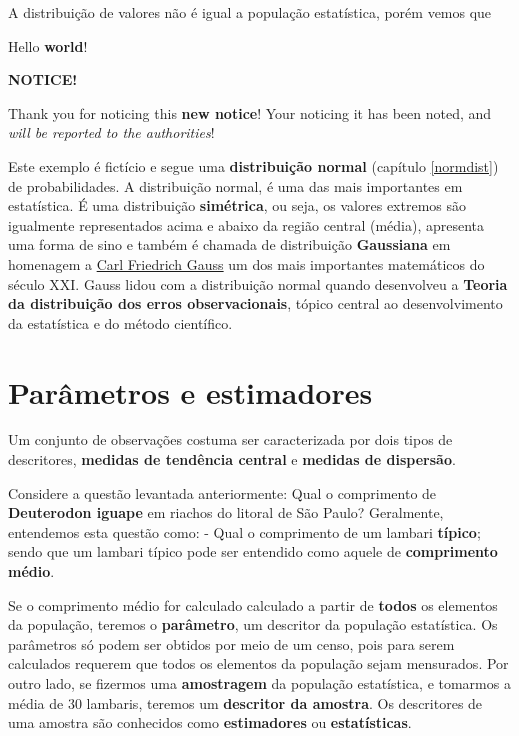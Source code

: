 \documentclass[
]{book}
\begin{document}
A distribuição de valores não é igual a população estatística, porém vemos que

\leavevmode{}%
Hello \textbf{world}!

\begin{blackbox}

\begin{center}
\textbf{NOTICE!}

\end{center}

Thank you for noticing this \textbf{new notice}! Your noticing it has
been noted, and \emph{will be reported to the authorities}!

\end{blackbox}

Este exemplo é fictício e segue uma \textbf{distribuição normal} (capítulo \ref{normdist}) de probabilidades. A distribuição normal, é uma das mais importantes em estatística. É uma distribuição \textbf{simétrica}, ou seja, os valores extremos são igualmente representados acima e abaixo da região central (média), apresenta uma forma de sino e também é chamada de distribuição \textbf{Gaussiana} em homenagem a \href{https://en.wikipedia.org/wiki/Carl_Friedrich_Gauss}{Carl Friedrich Gauss} um dos mais importantes matemáticos do século XXI. Gauss lidou com a distribuição normal quando desenvolveu a \textbf{Teoria da distribuição dos erros observacionais}, tópico central ao desenvolvimento da estatística e do método científico.

\hypertarget{paruxe2metros-e-estimadores}{%
\section{Parâmetros e estimadores}\label{paruxe2metros-e-estimadores}}

Um conjunto de observações costuma ser caracterizada por dois tipos de descritores, \textbf{medidas de tendência central} e \textbf{medidas de dispersão}.

Considere a questão levantada anteriormente: Qual o comprimento de \textbf{Deuterodon iguape} em riachos do litoral de São Paulo? Geralmente, entendemos esta questão como: - Qual o comprimento de um lambari \textbf{típico}; sendo que um lambari típico pode ser entendido como aquele de \textbf{comprimento médio}.

Se o comprimento médio for calculado calculado a partir de \textbf{todos} os elementos da população, teremos o \textbf{parâmetro}, um descritor da população estatística. Os parâmetros só podem ser obtidos por meio de um censo, pois para serem calculados requerem que todos os elementos da população sejam mensurados. Por outro lado, se fizermos uma \textbf{amostragem} da população estatística, e tomarmos a média de 30 lambaris, teremos um \textbf{descritor da amostra}. Os descritores de uma amostra são conhecidos como \textbf{estimadores} ou \textbf{estatísticas}.
\end{document}
